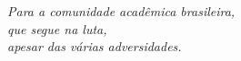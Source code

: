 \documentclass[
	12pt,				%
	openright,			%
	oneside,			%
	a4paper,			%
	chapter=TITLE,		%
	english,			%
	french,				%
	spanish,			%
	brazil				%
	]{abntex2}
\theoremstyle{definition}
\renewcommand{\pretextual}{
  \pagenumbering{roman} %
  \aliaspagestyle{chapter}{estilo_pretextual}%
  \pagestyle{estilo_pretextual}
  \aliaspagestyle{cleared}{empty}
  \aliaspagestyle{part}{estilo_pretextual}
}
\begin{document}
\frenchspacing 


\imprimircapa

\imprimirfolhaderosto
%     
\newpage
\begin{fichacatalografica}
	\imprimirfichacatalografica
\end{fichacatalografica}

% 
\begin{folhadeaprovacao}
	\ufpaPaginaDeAprovacao
\end{folhadeaprovacao}

\begin{dedicatoria}
   \vspace*{\fill}
   \noindent
   \begin{flushright}
      \textit{Para a comunidade acadêmica brasileira,}\\
      \textit{que segue na luta,}\\
      \textit{apesar das várias adversidades.}
   \end{flushright}
\end{dedicatoria}
\end{document}
